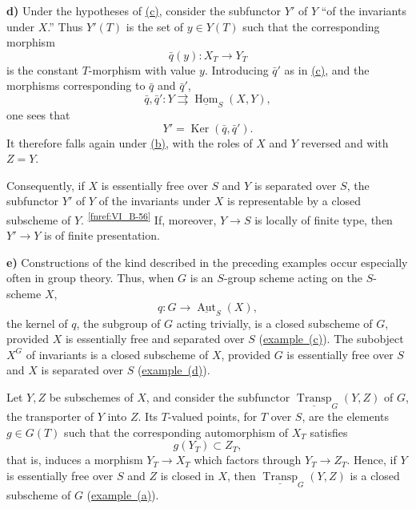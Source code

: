 \medskip
{}\label{ex:sga3-VIB-6.2.4-d}%
\noindent\textbf{d)}
Under the hypotheses of \hyperref[ex:sga3-VIB-6.2.4-c]{(c)},
consider the subfunctor \(Y'\) of \(Y\) ``of the invariants under
\(X\).'' Thus \(Y'(T)\) is the set of \(y\in Y(T)\) such that
the corresponding morphism
\[
  \bar q(y):X_T\longrightarrow Y_T
\]
is the constant \(T\)-morphism with value \(y\). Introducing
\(\bar q'\) as in \hyperref[ex:sga3-VIB-6.2.4-c]{(c)}, and the
morphisms corresponding to \(\bar q\) and \(\bar q'\),
\[
  \bar q,\bar q':Y\rightrightarrows
  \underline{\operatorname{Hom}}_S(X,Y),
\]
one sees that
\[
  Y'=\operatorname{Ker}(\bar q,\bar q').
\]
It therefore falls again under
\hyperref[ex:sga3-VIB-6.2.4-b]{\textup{(b)}}, with the roles of
\(X\) and \(Y\) reversed and with \(Z=Y\).

Consequently, if \(X\) is essentially free over \(S\) and \(Y\)
is separated over \(S\), the subfunctor \(Y'\) of \(Y\) of the
invariants under \(X\) is representable by a closed subscheme of
\(Y\).%
\textsuperscript{\normalfont\ref{fnref:VI_B-56}}
If, moreover, \(Y\to S\) is locally of finite type, then
\(Y'\to Y\) is of finite presentation.

\medskip
{}\label{ex:sga3-VIB-6.2.4-e}%
\noindent\textbf{e)}
Constructions of the kind described in the preceding examples
occur especially often in group theory. Thus, when \(G\) is an
\(S\)-group scheme acting on the \(S\)-scheme \(X\),
\[
  q:G\longrightarrow\underline{\operatorname{Aut}}_S(X),
\]
the kernel of \(q\), the subgroup of \(G\) acting trivially, is a
closed subscheme of \(G\), provided \(X\) is essentially free and
separated over \(S\)
(\hyperref[ex:sga3-VIB-6.2.4-c]{example~(c)}). The subobject
\(X^G\) of invariants is a closed subscheme of \(X\), provided
\(G\) is essentially free over \(S\) and \(X\) is separated over
\(S\) (\hyperref[ex:sga3-VIB-6.2.4-d]{example~(d)}).

Let \(Y,Z\) be subschemes of \(X\), and consider the subfunctor
\(\underline{\operatorname{Transp}}_G(Y,Z)\) of \(G\), the
transporter of \(Y\) into \(Z\). Its \(T\)-valued points, for
\(T\) over \(S\), are the elements \(g\in G(T)\) such that the
corresponding automorphism of \(X_T\) satisfies
\[
  g(Y_T)\subset Z_T,
\]
that is, induces a morphism \(Y_T\to X_T\) which factors through
\(Y_T\to Z_T\). Hence, if \(Y\) is essentially free over \(S\)
and \(Z\) is closed in \(X\), then
\(\underline{\operatorname{Transp}}_G(Y,Z)\) is a closed
subscheme of \(G\)
(\hyperref[ex:sga3-VIB-6.2.4-a]{example~(a)}).

